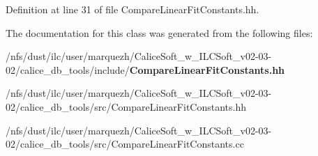 Definition at line 31 of file Compare\-Linear\-Fit\-Constants.\-hh.



The documentation for this class was generated from the following files\-:\begin{DoxyCompactItemize}
\item 
/nfs/dust/ilc/user/marquezh/\-Calice\-Soft\-\_\-w\-\_\-\-I\-L\-C\-Soft\-\_\-v02-\/03-\/02/calice\-\_\-db\-\_\-tools/include/{\bf Compare\-Linear\-Fit\-Constants.\-hh}\item 
/nfs/dust/ilc/user/marquezh/\-Calice\-Soft\-\_\-w\-\_\-\-I\-L\-C\-Soft\-\_\-v02-\/03-\/02/calice\-\_\-db\-\_\-tools/src/Compare\-Linear\-Fit\-Constants.\-hh\item 
/nfs/dust/ilc/user/marquezh/\-Calice\-Soft\-\_\-w\-\_\-\-I\-L\-C\-Soft\-\_\-v02-\/03-\/02/calice\-\_\-db\-\_\-tools/src/Compare\-Linear\-Fit\-Constants.\-cc\end{DoxyCompactItemize}
